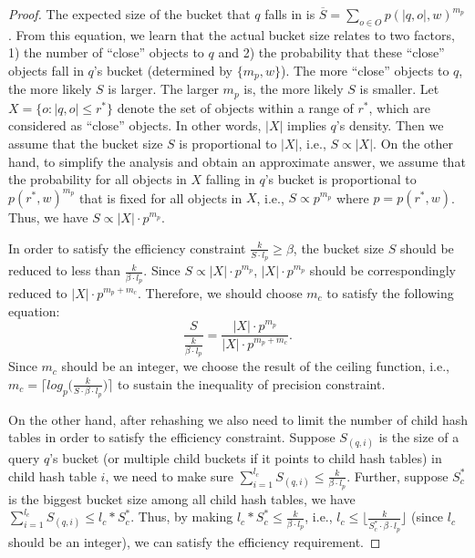\begin{proof}
The expected size of the bucket that $q$ falls in is $\overline S=\sum_{o\in O}p(|q,o|,w)^{m_p}$. From this equation, we learn that the actual bucket size relates to two factors, 1) the number of ``close'' objects to $q$ and 2) the probability that these ``close'' objects fall in $q$'s bucket (determined by $\{m_p,w\}$). The more ``close'' objects to $q$, the more likely $S$ is larger. The larger $m_p$ is, the more likely $S$ is smaller. Let $X=\{o:|q,o|\leq r^*\}$ denote the set of objects within a range of $r^*$, which are considered as ``close'' objects. In other words, $|X|$ implies $q$'s density. Then we assume that the bucket size $S$ is proportional to $|X|$, i.e., $S\propto |X|$. On the other hand, to simplify the analysis and obtain an approximate answer, we assume that the probability for all objects in $X$ falling in $q$'s bucket is proportional to $p(r^*,w)^{m_p}$ that is fixed for all objects in $X$, i.e., $S\propto p^{m_p}$ where $p=p(r^*,w)$. Thus, we have $S\propto|X|\cdot p^{m_p}$.

In order to satisfy the efficiency constraint $\frac{k}{S\cdot l_p}\geq\beta$, the bucket size $S$ should be reduced to less than $\frac{k}{\beta\cdot l_p}$. Since $S\propto|X|\cdot p^{m_p}$, $|X|\cdot p^{m_p}$ should be correspondingly reduced to $|X|\cdot p^{m_p+m_c}$. Therefore, we should choose $m_c$ to satisfy the following equation:
\begin{equation}\label{eq:forefficiency2}
    \frac{S}{\frac{k}{\beta\cdot l_p}}=\frac{|X|\cdot p^{m_p}}{|X|\cdot p^{m_p+m_c}}.
\end{equation}
Since $m_c$ should be an integer, we choose the result of the ceiling function, i.e., $m_c=\big\lceil log_{p}\big(\frac{k}{S\cdot\beta\cdot l_p}\big)\big\rceil$ to sustain the inequality of precision constraint.

On the other hand, after rehashing we also need to limit the number of child hash tables in order to satisfy the efficiency constraint. Suppose $S_{(q,i)}$ is the size of a query $q$'s bucket (or multiple child buckets if it points to child hash tables) in child hash table $i$, we need to make sure $\sum_{i=1}^{l_c}S_{(q,i)}\leq \frac{k}{\beta\cdot l_p}$. Further, suppose $S_c^*$ is the biggest bucket size among all child hash tables, we have $\sum_{i=1}^{l_c}S_{(q,i)}\leq l_c*S_c^*$. Thus, by making $l_c*S_c^*\leq\frac{k}{\beta\cdot l_p}$, i.e., $l_c\leq\big\lfloor\frac{k}{S_c^*\cdot\beta\cdot l_p}\big\rfloor$ (since $l_c$ should be an integer), we can satisfy the efficiency requirement.
\end{proof}

